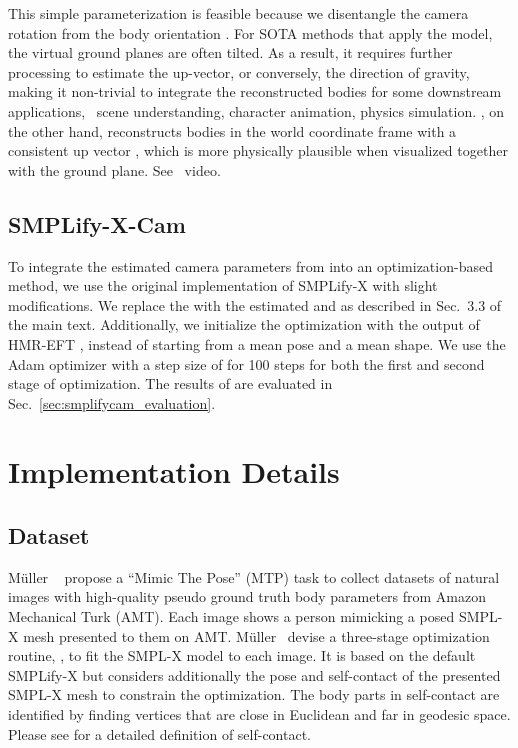 \documentclass[10pt,twocolumn,letterpaper,usenames,dvipsnames]{article}
\begin{document}
This simple parameterization is feasible because we disentangle the camera rotation  from the body orientation .
For SOTA methods that apply the \iwcam model, the virtual ground planes are often tilted.
As a result, it requires further processing to estimate the up-vector, or conversely, the direction of gravity, 
making it non-trivial to integrate the reconstructed bodies for some downstream applications, \eg~scene understanding, character animation, physics simulation. 
\methodname, on the other hand, reconstructs bodies in the world coordinate frame with a consistent up vector , 
which is more physically plausible when visualized together with the ground plane. See \supmat~video.

\subsection{SMPLify-X-Cam} 
To integrate the estimated camera parameters from \camcalib into an optimization-based method, 
we use the original implementation of SMPLify-X \cite{SMPL-X:2019} with slight modifications. 
We replace the \iwcam with the estimated  and  as described in Sec.~3.3 of the main text.
Additionally, we initialize the optimization with the output of HMR-EFT \cite{joo2020eft}, instead of starting from a mean pose and a mean shape.
We use the Adam optimizer with a step size of  for 100 steps for both the first and second stage of optimization.
The results of \smplify are evaluated in Sec.~\ref{sec:smplifycam_evaluation}.

\section{Implementation Details}
\subsection{\mtpcam Dataset}
M\"uller \etal~\cite{Mueller:CVPR:21} propose a ``Mimic The Pose'' (MTP) task 
to collect datasets of natural images with high-quality pseudo ground truth body parameters from Amazon Mechanical Turk (AMT).
Each image shows a person mimicking a posed SMPL-X mesh presented to them on AMT. 
M\"uller \etal~devise a three-stage optimization routine, \smplifyxc, to fit the SMPL-X model to each image. 
It is based on the default SMPLify-X \cite{SMPL-X:2019} but considers additionally the pose  and self-contact  of the presented SMPL-X mesh to constrain the optimization. 
The body parts in self-contact are identified by finding vertices that are close in Euclidean and far in geodesic space. 
Please see \cite{Mueller:CVPR:21} for a detailed definition of self-contact.
\end{document}
